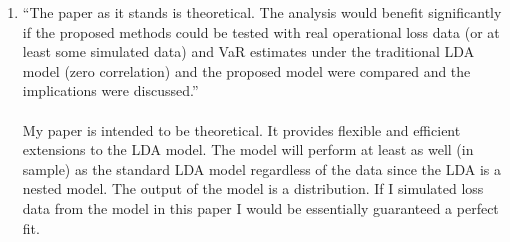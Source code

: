 \documentclass{article}
\theoremstyle{definition}
\begin{document}
\begin{enumerate}
\item \label{item5}
``The paper as it stands is theoretical. The analysis would benefit significantly if the proposed methods could be tested with real operational loss data (or at least some simulated data) and VaR estimates under the traditional LDA model (zero correlation) and the proposed model were compared and the implications were discussed.''
\\
\\
My paper is intended to be theoretical.  It provides flexible and efficient extensions to the LDA model.  The model will perform at least as well (in sample) as the standard LDA model regardless of the data since the LDA is a nested model.  The output of the model is a distribution.  If I simulated loss data from the model in this paper I would be essentially guaranteed a perfect fit.  



\end{enumerate}
\end{document}
